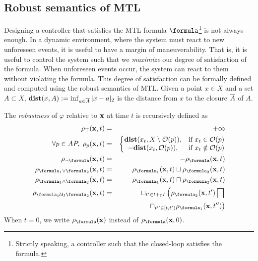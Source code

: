 \subsection{Robust semantics of MTL}
\label{sec:rob sem}
Designing a controller that satisfies the MTL formula $\formula$\footnote{Strictly speaking, a controller such that the closed-loop satisfies the formula.} is not always enough.
In a dynamic environment, where the system must react to new unforeseen events, it is useful to have a margin of maneuverability.
That is, it is useful to control the system such that we \textit{maximize} our degree of satisfaction of the formula.
When unforeseen events occur, the system can react to them without violating the formula.
This degree of satisfaction can be formally defined and computed using the robust semantics of MTL.
Given a point $x \in X$ and a set $A \subset X$, $\mathbf{dist}(x,A) := \inf_{a \in \overline{A}}|x-a|_2$ is the distance from $x$  to the closure $\overline{A}$ of $A$.
\begin{definition}
	\label{def:robustness estimate}
	The \emph{robustness} of $\varphi$ relative to $\mathbf{x}$ at time $t$ is recursively defined as 
	\begin{eqnarray*}
		\label{eq:robustness estimate}
		\rob_{\top} (\sstraj,t) &=& +\infty
		\\
		\forall p \in AP, \;  \rob_{p} (\sstraj,t) &=& \left \lbrace \begin{matrix}
			\dist(\stPt_t, \stSet \setminus \Oc(p)), &\text{if } \stPt_t \in \Oc(p)
			\\
			-\dist(x_t, \Oc(p)), &\text{if } \stPt_t \notin \Oc(p)						
		\end{matrix} \right.
		\\
		\rob_{\lnot \formula} (\sstraj,t) &=& - \rob_{\formula} (\sstraj,t)
		\\
		\rob_{ \formula_1 \lor \formula_2} (\sstraj,t) &=& \rob_{\formula_1} (\sstraj,t) \sqcup \rob_{\formula_2} (\sstraj,t) 
		\\
		\rob_{ \formula_1 \land \formula_2} (\sstraj,t) &=& \rob_{\formula_1} (\sstraj,t) \sqcap \rob_{\formula_2} (\sstraj,t) 
		\\
		\rob_{ \formula_1 \until_I \formula_2} (\sstraj,t) &=& \sqcup_{t' \in t+_{\TDom}I} \left(\rob_{\formula_2} (\sstraj,t') \bigsqcap \right.
		\\
		&& \left. \sqcap_{t'' \in [t,t')}   \rob_{\formula_1} (\sstraj,t'') \right) 
	\end{eqnarray*}
	When $t=0$, we write $\robf(\sstraj)$ instead of $\robf(\sstraj,0)$.
\end{definition}
